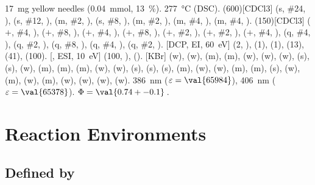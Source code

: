 \documentclass[load-preamble+]{cnltx-doc}
\begin{document}
\begin{experimental}[
    format=\color{red}\itshape,
    list=true,
    delta=\textcolor{green}{\ch{M+ + H2O}},
    pos-number=side,
    coupling-unit=\mega\gram\per\square\second,
    list-setup=,use-equal]
   \SI{17}{\milli\gram} yellow needles (\SI{0.04}{\milli\mole},
  \SI{13}{\percent}).
   \SI{277}{\celsius} (DSC).
  \NMR(600)[CDCl3]  (s, \#{24}, ),  (s, \#{12},
  ),  (m, \#{2}, ),  (s, \#{8},
  ),  (m, \#{2}, ),  (m, \#{4},
  ),  (m, \#{4}, ).
  (150)[CDCl3]  ($+$, \#{4}, ),  ($+$,
  \#{8}, ),  ($+$, \#{4}, ),  ($+$, \#{8},
  ),  ($+$, \#{2}, ),  ($+$, \#{2},
  ),  ($+$, \#{4}, ),  (q, \#{4},
  ),  (q, \#{2}, ),  (q, \#{8}, ),
   (q, \#{4}, ),  (q, \#{2}, ).
  [DCP, EI, \SI{60}{\electronvolt}]  (2, ), 
  (1),  (1),  (13),  (41),  (100).
  [, ESI, \SI{10}{\electronvolt}]  (100,
  ),  ().
  [KBr]  (w),  (w),  (m), 
  (m),  (w),  (w),  (w),  (s),
   (s),  (w),  (m),  (m), 
  (m),  (w),  (w),  (s),  (s),
   (s),  (m),  (w),  (w), 
  (m),  (m),  (s),  (w),  (m), 
  (w),  (m),  (w),  (w),  (w), 
  (w).
   \SI{386}{\nano\metre} ($\varepsilon = \val{65984}$),
  \SI{406}{\nano\metre} ($\varepsilon = \val{65378}$).
   $\Phi = \val{0.74+-0.1}$\,.
\end{experimental}

\section{Reaction Environments}\label{sec:reactions}
\subsection{Defined by \chemmacros}
\end{document}
